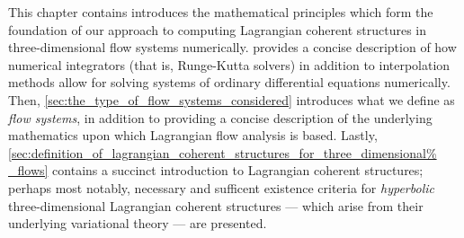 This chapter contains introduces the mathematical principles which form the
foundation of our approach to computing Lagrangian coherent structures in
three-dimensional flow systems numerically.
 provides a
concise description of how numerical integrators (that is, Runge-Kutta
solvers) in addition to interpolation methods allow for solving systems
of ordinary differential equations numerically. Then,
\cref{sec:the_type_of_flow_systems_considered} introduces what we define as
\emph{flow systems}, in addition to providing a concise description of the
underlying mathematics upon which Lagrangian flow analysis is based. Lastly,
\cref{sec:definition_of_lagrangian_coherent_structures_for_three_dimensional%
_flows} contains a succinct introduction to Lagrangian coherent structures;
perhaps most notably, necessary and sufficent existence criteria for
\emph{hyperbolic} three-dimensional Lagrangian coherent structures --- which
arise from their underlying variational theory --- are presented.
